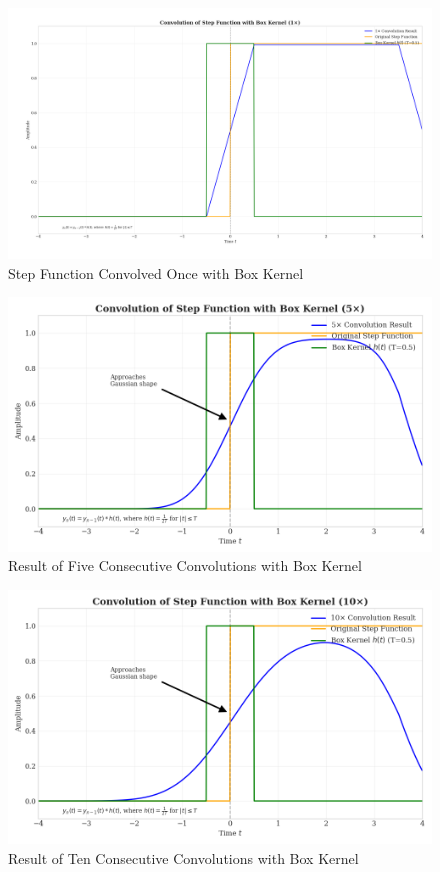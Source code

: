 \documentclass{article}
\begin{document}
\begin{figure}[H]
\centering
\includegraphics[width=1\textwidth]{figs/1_repeat.png}
\caption{Step Function Convolved Once with Box Kernel}
\end{figure}

\begin{figure}[H]
\centering
\includegraphics[width=1\textwidth]{figs/5_repeat.png}
\caption{Result of Five Consecutive Convolutions with Box Kernel}
\end{figure}

\begin{figure}[H]
\centering
\includegraphics[width=1\textwidth]{figs/10_repeat.png}
\caption{Result of Ten Consecutive Convolutions with Box Kernel}
\end{figure}
\end{document}
